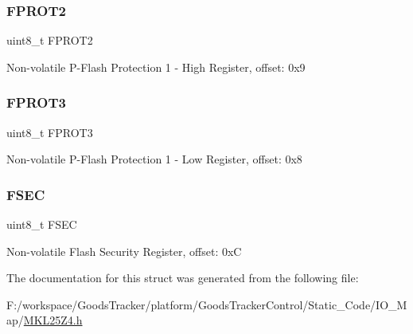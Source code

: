 \subsubsection{\texorpdfstring{F\+P\+R\+O\+T2}{FPROT2}}
{\footnotesize\ttfamily uint8\+\_\+t F\+P\+R\+O\+T2}

Non-\/volatile P-\/\+Flash Protection 1 -\/ High Register, offset\+: 0x9 \mbox{\label{struct_n_v___mem_map_a84a4810c0a2da0b5c5a6205e551e0bf6}} 
\subsubsection{\texorpdfstring{F\+P\+R\+O\+T3}{FPROT3}}
{\footnotesize\ttfamily uint8\+\_\+t F\+P\+R\+O\+T3}

Non-\/volatile P-\/\+Flash Protection 1 -\/ Low Register, offset\+: 0x8 \mbox{\label{struct_n_v___mem_map_a4c7b35caf2d96b1c13a8cb7e15445dcb}} 
\subsubsection{\texorpdfstring{F\+S\+EC}{FSEC}}
{\footnotesize\ttfamily uint8\+\_\+t F\+S\+EC}

Non-\/volatile Flash Security Register, offset\+: 0xC 

The documentation for this struct was generated from the following file\+:\begin{DoxyCompactItemize}
\item 
F\+:/workspace/\+Goods\+Tracker/platform/\+Goods\+Tracker\+Control/\+Static\+\_\+\+Code/\+I\+O\+\_\+\+Map/\hyperlink{_m_k_l25_z4_8h}{M\+K\+L25\+Z4.\+h}\end{DoxyCompactItemize}
